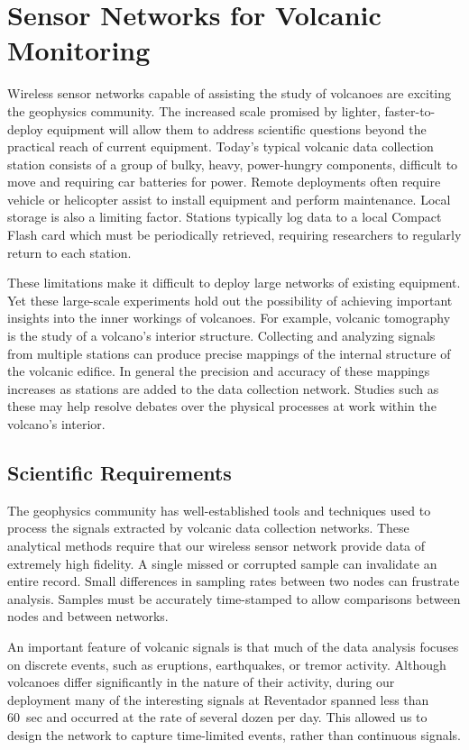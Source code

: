 \section{Sensor Networks for Volcanic Monitoring}

Wireless sensor networks capable of assisting the study of volcanoes are exciting the
geophysics community.  The increased scale promised by lighter,
faster-to-deploy equipment will allow them to address scientific questions
beyond the practical reach of current equipment.  Today's
typical volcanic data collection station consists of a group of bulky,
heavy, power-hungry components, difficult to move and requiring car batteries
for power.  Remote deployments often require vehicle or helicopter assist to
install equipment and perform maintenance.  Local storage is also a
limiting factor.  Stations typically log data to a local Compact Flash card
which must be periodically retrieved, requiring researchers to regularly
return to each station.

These limitations make it difficult to deploy large networks of existing
equipment. Yet these large-scale experiments hold out the possibility of
achieving important insights into the inner workings of volcanoes.  For
example, volcanic tomography~\cite{lees-tomography} is the study of a
volcano's interior structure.  Collecting and analyzing signals from 
multiple stations can produce precise mappings of the internal structure of
the volcanic edifice.  In general the precision and accuracy of these
mappings increases as stations are added to the data collection network.
Studies such as these may help resolve debates over the physical processes at
work within the volcano's interior.

\subsection{Scientific Requirements}

The geophysics community has well-established tools and techniques used to
process the signals extracted by volcanic data collection networks.  These
analytical methods require that our wireless sensor network provide data of
extremely high fidelity.  A single missed or corrupted sample can invalidate
an entire record. Small differences in sampling rates between two nodes can
frustrate analysis.  Samples must be accurately time-stamped to allow
comparisons between nodes and between networks.

An important feature of volcanic signals is that much of the data analysis
focuses on discrete events, such as eruptions, earthquakes, or tremor
activity.  Although volcanoes differ significantly in the nature of their
activity, during our deployment many of the interesting signals at
Reventador spanned less than 60~sec and occurred at the rate of several dozen
per day. This allowed us to design the network to capture
time-limited events, rather than continuous signals. 

